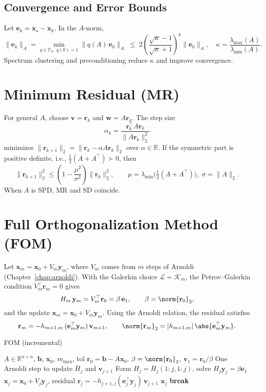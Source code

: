 \subsection{Convergence and Error Bounds}
Let $\mathbf{e}_k=\mathbf{x}_\star-\mathbf{x}_k$. In the $A$-norm,
\[
  \|\mathbf{e}_k\|_A=\min_{q\in\mathbb{P}_k,\;q(0)=1}\|q(A)\,\mathbf{e}_0\|_A\;\le\;2\left(\frac{\sqrt{\kappa}-1}{\sqrt{\kappa}+1}\right)^k\|\mathbf{e}_0\|_A,\quad \kappa=\frac{\lambda_{\max}(A)}{\lambda_{\min}(A)}.
\]
Spectrum clustering and preconditioning reduce $\kappa$ and improve convergence.

\section{Minimum Residual (MR)}
For general $A$, choose $\mathbf{v}=\mathbf{r}_k$ and $\mathbf{w}=A\mathbf{r}_k$. The step size
\[
  \alpha_k = \frac{\mathbf{r}_k^\top A\mathbf{r}_k}{\|A\mathbf{r}_k\|_2^2}
\]
minimizes $\|\mathbf{r}_{k+1}\|_2=\|\mathbf{r}_k-\alpha A\mathbf{r}_k\|_2$ over $\alpha\in\mathbb{R}$. If the symmetric part is positive definite, i.e., $\tfrac12(A+A^\top)\succ0$, then
\[
  \|\mathbf{r}_{k+1}\|_2^2 \le \left(1-\frac{\mu^2}{\sigma^2}\right)\|\mathbf{r}_k\|_2^2,\qquad \mu=\lambda_{\min}\bigl(\tfrac12(A+A^\top)\bigr),\;\sigma=\|A\|_2.
\]
When $A$ is SPD, MR and SD coincide.

\section{Full Orthogonalization Method (FOM)}
Let $\mathbf{x}_m=\mathbf{x}_0+V_m\mathbf{y}_m$, where $V_m$ comes from $m$ steps of Arnoldi (Chapter~\ref{chap:arnoldi}). With the Galerkin choice $\mathcal{L}=\mathcal{K}_m$, the Petrov--Galerkin condition $V_m^{\top}\mathbf{r}_m=0$ gives
\[
  H_m\,\mathbf{y}_m = V_m^{\top}\mathbf{r}_0 = \beta\,\mathbf{e}_1,\qquad \beta=\norm{\mathbf{r}_0}_2,
\]
and the update $\mathbf{x}_m=\mathbf{x}_0+V_m\mathbf{y}_m$. Using the Arnoldi relation, the residual satisfies
\[
  \mathbf{r}_m = -h_{m+1,m}\,(\mathbf{e}_m^{\top}\mathbf{y}_m)\,\mathbf{v}_{m+1},\qquad \norm{\mathbf{r}_m}_2 = |h_{m+1,m}|\,\abs{\mathbf{e}_m^{\top}\mathbf{y}_m}.
\]

\begin{algorithm}[ht]
  \caption{FOM (incremental)}
  \label{alg:fom-lecture}
  \begin{algorithmic}[0]
    \Require $A\in\mathbb{R}^{n\times n}$, $\mathbf{b}$, $\mathbf{x}_0$, $m_{\max}$, tol
    \State $\mathbf{r}_0=\mathbf{b}-A\mathbf{x}_0$, $\beta=\norm{\mathbf{r}_0}_2$, $\mathbf{v}_1=\mathbf{r}_0/\beta$
    \State One Arnoldi step to update $\overline H_j$ and $\mathbf{v}_{j+1}$
    \State Form $H_j=\overline H_j(1{:}j,1{:}j)$, solve $H_j\mathbf{y}_j=\beta\mathbf{e}_1$
    \State $\mathbf{x}_j=\mathbf{x}_0+V_j\mathbf{y}_j$, residual $\mathbf{r}_j = -h_{j+1,j}(\mathbf{e}_j^{\top}\mathbf{y}_j)\,\mathbf{v}_{j+1}$
     \Return $\mathbf{x}_j$ \EndIf
     \State \textbf{break}  \EndIf
    \EndFor
  \end{algorithmic}
\end{algorithm}

